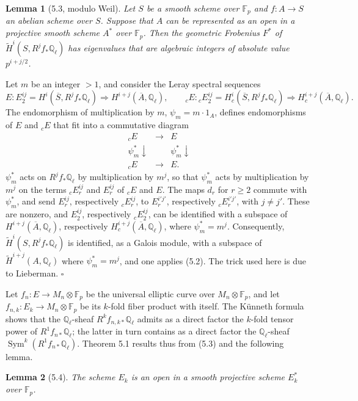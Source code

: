 \documentclass[10pt]{article}
\newcommand{\Q}{\mathbb Q}
\newcommand{\Sym}{\operatorname{Sym}}
\newcommand{\QED}{\hfill$\square$}
\newcommand{\F}{\mathbb F}
\newtheorem*{lemma}{Lemma}
\begin{document}
\begin{lemma}[5.3, modulo Weil]
Let $S$ be a smooth scheme over $\F_p$ and $f:A\to S$ an abelian scheme over $S$. Suppose that $A$ can be represented as an open in a projective smooth scheme $A^*$ over $\F_p$. Then the geometric Frobenius $F^*$ of $\widetilde H^i(S,R^jf_*\Q_\ell)$ has eigenvalues that are algebraic integers of absolute value $p^{i+j/2}$.
\end{lemma}

Let $m$ be an integer $>1$, and consider the Leray spectral sequences
\[
E:
E_2^{ij}=H^i(\overline S,R^jf_*\Q_\ell)\Longrightarrow H^{i+j}(\overline A,\Q_\ell),
\qquad
{}_cE:
{}_cE_2^{ij}=H_c^i(\overline S,R^jf_*\Q_\ell)\Longrightarrow H_c^{i+j}(\overline A,\Q_\ell).
\]
The endomorphism of multiplication by $m$, $\psi_m=m\cdot 1_A$, defines endomorphisms of $E$ and ${}_cE$ that fit into a commutative diagram
\[
\begin{array}{ccc}
{}_cE&\longrightarrow&E\\
\psi_m^*\downarrow&&\psi_m^*\downarrow\\
{}_cE&\longrightarrow&E.
\end{array}
\]
$\psi_m^*$ acts on $R^jf_*\Q_\ell$ by multiplication by $m^j$, so that $\psi_m^*$ acts by multiplication by $m^j$ on the terms ${}_cE_r^{ij}$ and $E_r^{ij}$ of ${}_cE$ and $E$. The maps $d_r$ for $r\ge 2$ commute with $\psi_m^*$, and send $E_r^{ij}$, respectively ${}_cE_r^{ij}$, to $E_r^{i'j'}$, respectively ${}_cE_r^{i'j'}$, with $j\ne j'$. These are nonzero, and $E_2^{ij}$, respectively ${}_cE_2^{ij}$, can be identified with a subspace of $H^{i+j}(\overline A,\Q_\ell)$, respectively $H_c^{i+j}(\overline A,\Q_\ell)$, where $\psi_m^*=m^j$. Consequently, $\widetilde H^i(S,R^jf_*\Q_\ell)$ is identified, as a Galois module, with a subspace of $\widetilde H^{i+j}(A,\Q_\ell)$ where $\psi_m^*=m^j$, and one applies (5.2). The trick used here is due to Lieberman. \QED

Let $f_n:E\to M_n\otimes\F_p$ be the universal elliptic curve over $M_n\otimes\F_p$, and let $f_{n,k}:E_k\to M_n\otimes\F_p$ be its $k$-fold fiber product with itself. The Künneth formula shows that the $\Q_\ell$-sheaf $R^kf_{n,k*}\Q_\ell$ admits as a direct factor the $k$-fold tensor power of $R^1f_{n*}\Q_\ell$; the latter in turn contains as a direct factor the $\Q_\ell$-sheaf $\Sym^k(R^1f_{n*}\Q_\ell)$. Theorem 5.1 results thus from (5.3) and the following lemma.

\begin{lemma}[5.4]
The scheme $E_k$ is an open in a smooth projective scheme $E_k^*$ over $\F_p$.
\end{lemma}
\end{document}
